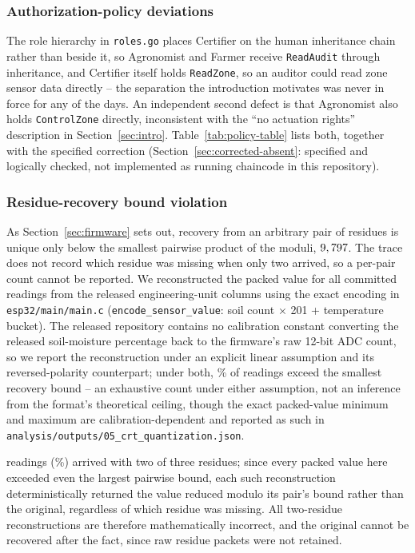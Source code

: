 \subsubsection{Authorization-policy deviations}
\label{sec:audit-policy}

The role hierarchy in \texttt{roles.go} places Certifier on the human inheritance chain rather than beside it, so Agronomist and Farmer receive \texttt{ReadAudit} through inheritance, and Certifier itself holds \texttt{ReadZone}, so an auditor could read zone sensor data directly -- the separation the introduction motivates was never in force for any of the \DeploymentDays{} days. An independent second defect is that Agronomist also holds \texttt{ControlZone} directly, inconsistent with the ``no actuation rights'' description in Section~\ref{sec:intro}. Table~\ref{tab:policy-table} lists both, together with the specified correction (Section~\ref{sec:corrected-absent}: specified and logically checked, not implemented as running chaincode in this repository).

\subsubsection{Residue-recovery bound violation}
\label{sec:crt-audit}

As Section~\ref{sec:firmware} sets out, recovery from an arbitrary pair of residues is unique only below the smallest pairwise product of the moduli, $9,797$. The trace does not record which residue was missing when only two arrived, so a per-pair count cannot be reported. We reconstructed the packed value for all \SensorReadings{} committed readings from the released engineering-unit columns using the exact encoding in \texttt{esp32/main/main.c} (\texttt{encode\_sensor\_value}: soil count $\times$ 201 + temperature bucket). The released repository contains no calibration constant converting the released soil-moisture percentage back to the firmware's raw 12-bit ADC count, so we report the reconstruction under an explicit linear assumption and its reversed-polarity counterpart; under both, \CrtExceedPct\% of \SensorReadings{} readings exceed the smallest recovery bound -- an exhaustive count under either assumption, not an inference from the format's theoretical ceiling, though the exact packed-value minimum and maximum are calibration-dependent and reported as such in \texttt{analysis/outputs/05\_crt\_quantization.json}.

\CrtTwoResidueCount{} readings (\CrtTwoResiduePct\%) arrived with two of three residues; since every packed value here exceeded even the largest pairwise bound, each such reconstruction deterministically returned the value reduced modulo its pair's bound rather than the original, regardless of which residue was missing. All \CrtTwoResidueCount{} two-residue reconstructions are therefore mathematically incorrect, and the original cannot be recovered after the fact, since raw residue packets were not retained.

